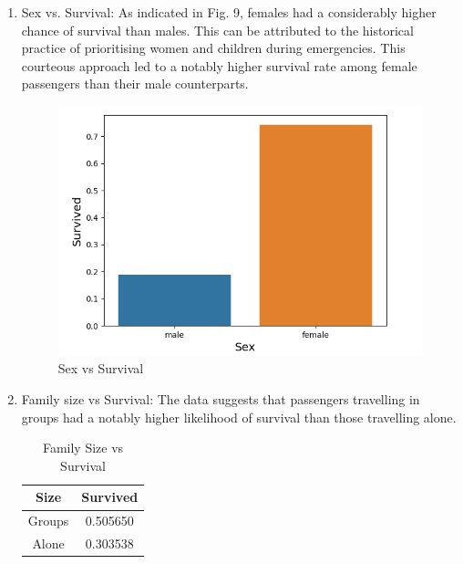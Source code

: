 \documentclass[conference]{IEEEtran}
\begin{document}
\begin{enumerate}
    \item Sex vs. Survival: As indicated in Fig. 9, females had a considerably higher chance of survival than males. This can be attributed to the historical practice of prioritising women and children during emergencies. This courteous approach led to a notably higher survival rate among female passengers than their male counterparts.
    \begin{figure}[htbp]
    \centerline{\includegraphics[scale = 0.56]{ Sex versus Survival.png}}
    \caption{Sex vs Survival}
    \label{fig}
    \end{figure}
    \item Family size vs Survival: The data suggests that passengers travelling in groups had a notably higher likelihood of survival than those travelling alone. 
    \begin{table}[h!]
      \begin{center}
        \caption{{Family Size vs Survival}}
        \label{tab:table1}
        \renewcommand{\arraystretch}{1.2} %
        \begin{tabular}{c|c} 
          \textbf{Size} & \textbf{Survived}\\
          \hline
          Groups & 0.505650\\
          Alone & 0.303538\\
        \end{tabular}
      \end{center}
    \end{table}
\end{enumerate}
\end{document}
